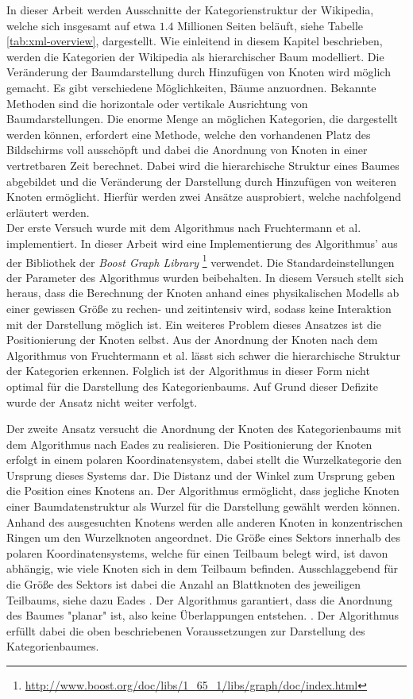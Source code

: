 In dieser Arbeit werden Ausschnitte der Kategorienstruktur der Wikipedia, welche sich insgesamt auf etwa $1.4$ Millionen Seiten beläuft, siehe Tabelle \ref{tab:xml-overview}, dargestellt.
Wie einleitend in diesem Kapitel beschrieben, werden die Kategorien der Wikipedia als hierarchischer Baum modelliert.
Die Veränderung der Baumdarstellung durch Hinzufügen von Knoten wird möglich gemacht. 
Es gibt verschiedene Möglichkeiten, Bäume anzuordnen. 
Bekannte Methoden sind die horizontale oder vertikale Ausrichtung von Baumdarstellungen.
Die enorme Menge an möglichen Kategorien, die dargestellt werden können, erfordert eine Methode, welche den vorhandenen Platz des Bildschirms voll ausschöpft und dabei die Anordnung von Knoten in einer vertretbaren Zeit berechnet.
Dabei wird die hierarchische Struktur eines Baumes abgebildet und die Veränderung der Darstellung durch Hinzufügen von weiteren Knoten ermöglicht.
Hierfür werden zwei Ansätze ausprobiert, welche nachfolgend erläutert werden.\\
Der erste Versuch wurde mit dem Algorithmus nach Fruchtermann et al. \cite{fruchterman1991graph} implementiert.
In dieser Arbeit wird eine Implementierung des Algorithmus' aus der Bibliothek der \emph{Boost Graph Library} \footnote{\url{http://www.boost.org/doc/libs/1_65_1/libs/graph/doc/index.html}} verwendet. Die Standardeinstellungen der Parameter des Algorithmus wurden beibehalten.
In diesem Versuch stellt sich heraus, dass die Berechnung der Knoten anhand eines physikalischen Modells ab einer gewissen Größe zu rechen- und zeitintensiv wird, sodass keine Interaktion mit der Darstellung möglich ist.
Ein weiteres Problem dieses Ansatzes ist die Positionierung der Knoten selbst.
Aus der Anordnung der Knoten nach dem Algorithmus von Fruchtermann et al. lässt sich schwer die hierarchische Struktur der Kategorien erkennen. 
Folglich ist der Algorithmus in dieser Form nicht optimal für die Darstellung des Kategorienbaums.
Auf Grund dieser Defizite wurde der Ansatz nicht weiter verfolgt.


Der zweite Ansatz versucht die Anordnung der Knoten des Kategorienbaums mit dem Algorithmus nach Eades \cite{eades1991drawing} zu realisieren.
Die Positionierung der Knoten erfolgt in einem polaren Koordinatensystem, dabei stellt die Wurzelkategorie den Ursprung dieses Systems dar.
Die Distanz und der Winkel zum Ursprung geben die Position eines Knotens an.
Der Algorithmus ermöglicht, dass jegliche Knoten einer Baumdatenstruktur als Wurzel für die Darstellung gewählt werden können. Anhand des ausgesuchten Knotens werden alle anderen Knoten in konzentrischen Ringen um den Wurzelknoten angeordnet.
Die Größe eines Sektors innerhalb des polaren Koordinatensystems, welche für einen Teilbaum belegt wird, ist davon abhängig, wie viele Knoten sich in dem Teilbaum befinden.
Ausschlaggebend für die Größe des Sektors ist dabei die Anzahl an Blattknoten des jeweiligen Teilbaums, siehe dazu Eades \cite[S.~15]{eades1991drawing}.
Der Algorithmus garantiert, dass die Anordnung des Baumes "planar" ist, also keine Überlappungen entstehen. \cite[S.~16]{eades1991drawing}.
Der Algorithmus erfüllt dabei die oben beschriebenen Voraussetzungen zur Darstellung des Kategorienbaumes.

